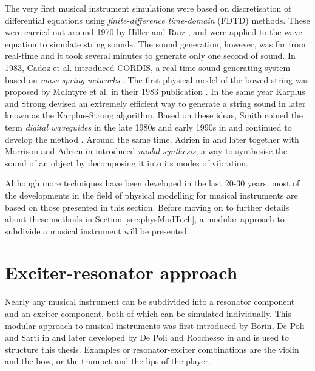 The very first musical instrument simulations were based on discretisation of differential equations using \textit{finite-difference time-domain} (FDTD) methods. These were carried out around 1970 by Hiller and Ruiz \cite{Ruiz1969, Hiller1971I, Hiller1971II}, and were applied to the wave equation to simulate string sounds. The sound generation, however, was far from real-time and it took several minutes to generate only one second of sound. In 1983, Cadoz et al. introduced CORDIS, a real-time sound generating system based on \textit{mass-spring networks} \cite{Cadoz1983}.
The first physical model of the bowed string was proposed by McIntyre et al. in their 1983 publication \cite{McIntyre1983}. In the same year Karplus and Strong devised an extremely efficient way to generate a string sound in \cite{Karplus1983} later known as the Karplus-Strong algorithm. Based on these ideas, Smith coined the term \textit{digital waveguides} in the late 1980s and early 1990s in \cite{Smith1987, Smith1992} and continued to develop the method \cite{Smith2010b}.
Around the same time, Adrien in \cite{Adrien1991} and later together with Morrison and Adrien in \cite{Morrison1993} introduced \textit{modal synthesis}, a way to synthesise the sound of an object by decomposing it into its modes of vibration. 

Although more techniques have been developed in the last 20-30 years, most of the developments in the field of physical modelling for musical instruments are based on those presented in this section. Before moving on to further details about these methods in Section \ref{sec:physModTech}, a modular approach to subdivide a musical instrument will be presented.

\section{Exciter-resonator approach}\label{sec:exciterResonator}
Nearly any musical instrument can be subdivided into a resonator component and an exciter component, both of which can be simulated individually. This modular approach to musical instruments was first introduced by Borin, De Poli and Sarti in \cite{Borin1989} and later developed by De Poli and Rocchesso in \cite{Poli1998} and is used to structure this thesis. Examples or resonator-exciter combinations are the violin and the bow, or the trumpet and the lips of the player. %

